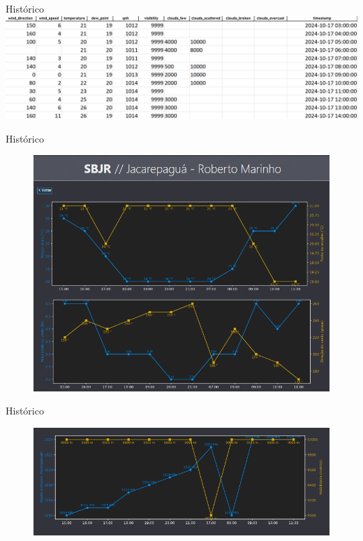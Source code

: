 \documentclass{beamer}
\begin{document}
\begin{frame}{Histórico}
    \includegraphics[width=0.9\linewidth]{img/image.png}
\end{frame}

\begin{frame}{Histórico}
    \begin{figure}[ht]
        \begin{center}
        \includegraphics[width=0.7\linewidth]{img/history-1.png}
        \label{fig:UI}
        \end{center}
    \end{figure}
\end{frame}

\begin{frame}{Histórico}
    \begin{figure}[ht]
        \begin{center}
        \includegraphics[width=0.7\linewidth]{img/history-2.png}
        \label{fig:UI}
        \end{center}
    \end{figure}
\end{frame}
\end{document}
